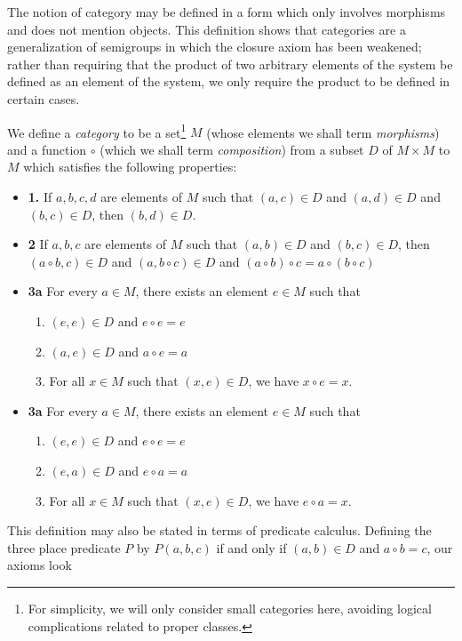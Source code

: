 \documentclass[12pt]{article}
\begin{document}
The notion of category may be defined in a form which only
involves morphisms and does not mention objects.  This
definition shows that categories are a generalization of
semigroups in which the closure axiom has been weakened;
rather than requiring that the product of two arbitrary
elements of the system be defined as an element of the 
system, we only require the product to be defined in
certain cases.

We define a \emph{category} to be a set\footnote{For 
simplicity, we will only consider small categories here, 
avoiding logical complications related to proper classes.} 
$M$ (whose elements we shall term \emph{morphisms}) and a
function $\circ$ (which we shall term \emph{composition})
from a subset $D$ of $M \times M$ to $M$ which satisfies the 
following properties:
\begin{itemize}
 \item{\bf 1.} If $a,b,c,d$ are elements of $M$ such that
  $(a,c) \in D$ and $(a,d) \in D$
  and $(b,c) \in D$, then $(b,d) \in D$.
 \item{\bf 2} If $a,b,c$ are elements of $M$ such that 
  $(a,b) \in D$ and $(b,c) \in D$,
  then $(a \circ b, c) \in D$ and
  $(a, b \circ c) \in D$ and
  $(a \circ b) \circ c = a \circ (b \circ c)$
 \item{\bf 3a} For every $a \in M$, there exists an element
  $e \in M$ such that
   \begin{enumerate}
    \item $(e,e) \in D$ and $e \circ e = e$
    \item $(a,e) \in D$ and $a \circ e = a$
    \item For all $x \in M$ such that $(x,e) \in D$, 
      we have $x \circ e = x$.
   \end{enumerate}
 \item{\bf 3a} For every $a \in M$, there exists an element
  $e \in M$ such that
   \begin{enumerate}
    \item $(e,e) \in D$ and $e \circ e = e$
    \item $(e,a) \in D$ and $e \circ a = a$
    \item For all $x \in M$ such that $(x,e) \in D$, 
      we have $e \circ a = x$.
   \end{enumerate}
\end{itemize}
This definition may also be stated in terms of predicate calculus.
Defining the three place predicate $P$ by $P(a,b,c)$ if and only if
$(a,b) \in D$ and $a \circ b = c$, our axioms look 
\end{document}
